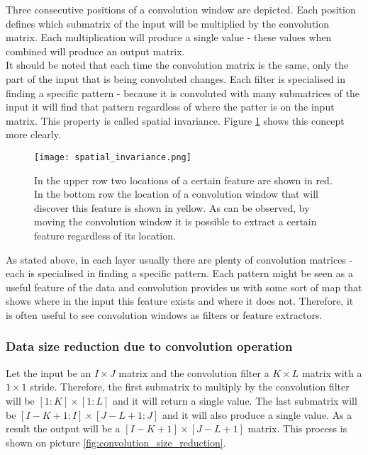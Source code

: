 \documentclass[a4paper,10pt]{report}
\begin{document}
	  Three consecutive positions of a convolution window are depicted. Each position defines which submatrix of the input will be multiplied by the convolution matrix. Each multiplication will produce a single value - these values when combined will produce an output matrix.\\
	  
	  It should be noted that each time the convolution matrix is the same, only the part of the input that is being convoluted changes. Each filter is specialised in finding a specific pattern - because it is convoluted with many submatrices of the input it will find that pattern regardless of where the patter is on the input matrix. This property is called spatial invariance. Figure \ref{fig:spatial_invariance} shows this concept more clearly.\\
	  	  
	  \begin{figure}[h!]
	    \centering
	    \texttt{[image: spatial\_invariance.png]}
	    \caption{In the upper row two locations of a certain feature are shown in red. In the bottom row the location of a convolution window that will discover this feature is shown in yellow. As can be observed, by moving the convolution window it is possible to extract a certain feature regardless of its location.}
	    \label{fig:spatial_invariance}
	  \end{figure} 
	  
	  
	  As stated above, in each layer usually there are plenty of convolution matrices - each is specialised in finding a specific pattern. Each pattern might be seen as a useful feature of the data and convolution provides us with some sort of map that shows where in the input this feature exists and where it does not. Therefore, it is often useful to see convolution windows as filters or feature extractors.\\
	  
	  \subsubsection{Data size reduction due to convolution operation}
	  
 	  Let the input be an $I\times J$ matrix and the convolution filter a $K\times L$ matrix with a $1\times1$ stride. Therefore, the first submatrix to multiply by the convolution filter will be $[1:K]\times[1:L]$ and it will return a single value. The last submatrix will be $[I-K+1:I]\times[J-L+1:J]$ and it will also produce a  single value. As a result the output will be a $[I-K+1]\times[J-L+1]$ matrix. This process is shown on picture \ref{fig:convolution_size_reduction}.\\
	  
\end{document}
